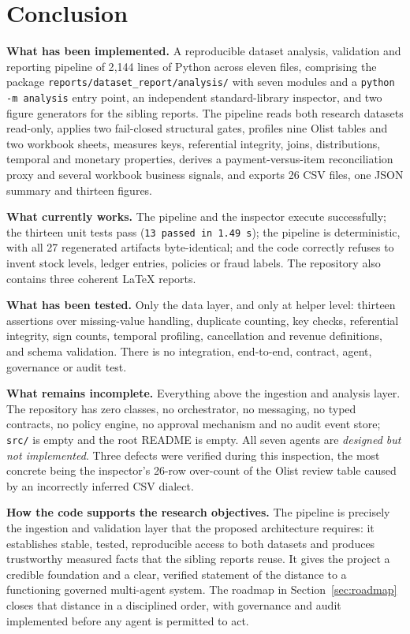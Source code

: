 \documentclass[11pt,a4paper]{article}
\newcommand{\code}[1]{\texttt{#1}}
\begin{document}
\section{Conclusion}
\textbf{What has been implemented.} A reproducible dataset analysis, validation and reporting pipeline of 2{,}144 lines of Python across eleven files, comprising the package \code{reports/dataset\_report/analysis/} with seven modules and a \code{python -m analysis} entry point, an independent standard-library inspector, and two figure generators for the sibling reports. The pipeline reads both research datasets read-only, applies two fail-closed structural gates, profiles nine Olist tables and two workbook sheets, measures keys, referential integrity, joins, distributions, temporal and monetary properties, derives a payment-versus-item reconciliation proxy and several workbook business signals, and exports 26 CSV files, one JSON summary and thirteen figures.

\textbf{What currently works.} The pipeline and the inspector execute successfully; the thirteen unit tests pass (\code{13 passed in 1.49\,s}); the pipeline is deterministic, with all 27 regenerated artifacts byte-identical; and the code correctly refuses to invent stock levels, ledger entries, policies or fraud labels. The repository also contains three coherent \LaTeX{} reports.

\textbf{What has been tested.} Only the data layer, and only at helper level: thirteen assertions over missing-value handling, duplicate counting, key checks, referential integrity, sign counts, temporal profiling, cancellation and revenue definitions, and schema validation. There is no integration, end-to-end, contract, agent, governance or audit test.

\textbf{What remains incomplete.} Everything above the ingestion and analysis layer. The repository has zero classes, no orchestrator, no messaging, no typed contracts, no policy engine, no approval mechanism and no audit event store; \code{src/} is empty and the root README is empty. All seven agents are \emph{designed but not implemented}. Three defects were verified during this inspection, the most concrete being the inspector's 26-row over-count of the Olist review table caused by an incorrectly inferred CSV dialect.

\textbf{How the code supports the research objectives.} The pipeline is precisely the ingestion and validation layer that the proposed architecture requires: it establishes stable, tested, reproducible access to both datasets and produces trustworthy measured facts that the sibling reports reuse. It gives the project a credible foundation and a clear, verified statement of the distance to a functioning governed multi-agent system. The roadmap in Section~\ref{sec:roadmap} closes that distance in a disciplined order, with governance and audit implemented before any agent is permitted to act.
\end{document}
